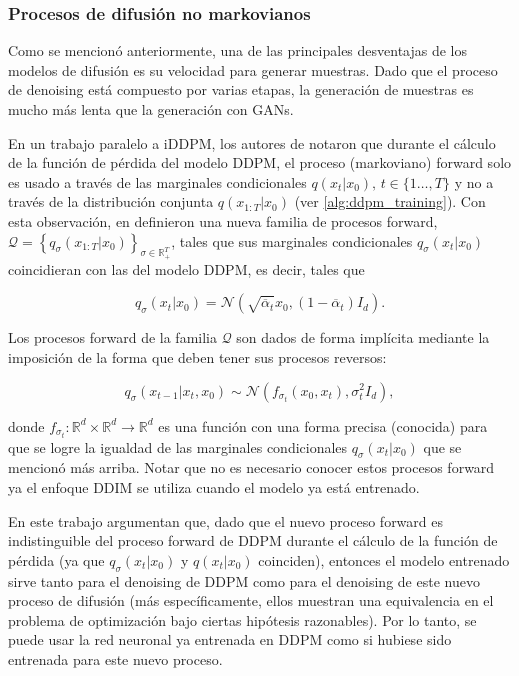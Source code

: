 \subsubsection{Procesos de difusión no markovianos}

Como se mencionó anteriormente, una de las principales desventajas de los modelos de difusión es su velocidad para generar muestras. Dado que el proceso de denoising está compuesto por varias etapas, la generación de muestras es mucho más lenta que la generación con GANs.

En un trabajo paralelo a iDDPM, los autores de \cite{song2022denoising} notaron que durante el cálculo de la función de pérdida del modelo DDPM, el proceso (markoviano) forward solo es usado a través de las marginales condicionales $q(x_t|x_0),\,t\in\{1\ldots,T\}$ y no a través de la distribución conjunta $q(x_{1:T}|x_0)$ (ver \autoref{alg:ddpm_training}). Con esta observación, en \cite{song2022denoising} definieron una nueva familia de procesos forward, $\mathcal{Q} = \left\{q_\sigma(x_{1:T}|x_0)\right\}_{\sigma\in\mathbb{R}_+^T}$, tales que sus marginales condicionales $q_\sigma(x_t|x_0)$ coincidieran con las del modelo DDPM, es decir, tales que

\begin{equation*}
    q_\sigma(x_t|x_0) = \mathcal{N}\left(\sqrt{\overline{\alpha}_t}x_0,(1-\overline{\alpha}_t)I_d\right).
\end{equation*}

Los procesos forward de la familia $\mathcal{Q}$ son dados de forma implícita mediante la imposición de la forma que deben tener sus procesos reversos:

\begin{equation*}
    q_\sigma(x_{t-1}|x_t,x_0)\sim\mathcal{N}\left(f_{\sigma_t}(x_0,x_t),\sigma_t^2 I_d\right),
\end{equation*}

donde $f_{\sigma_t}:\mathbb{R}^d\times\mathbb{R}^d\to\mathbb{R}^d$ es una función con una forma precisa (conocida) para que se logre la igualdad de las marginales condicionales $q_\sigma(x_t|x_0)$ que se mencionó más arriba. Notar que no es necesario conocer estos procesos forward ya el enfoque DDIM se utiliza cuando el modelo ya está entrenado.

En este trabajo argumentan que, dado que el nuevo proceso forward es indistinguible del proceso forward de DDPM durante el cálculo de la función de pérdida (ya que $q_\sigma(x_t|x_0)$ y $q(x_t|x_0)$ coinciden), entonces el modelo entrenado sirve tanto para el denoising de DDPM como para el denoising de este nuevo proceso de difusión (más específicamente, ellos muestran una equivalencia en el problema de optimización bajo ciertas hipótesis razonables). Por lo tanto, se puede usar la red neuronal ya entrenada en DDPM como si hubiese sido entrenada para este nuevo proceso.

